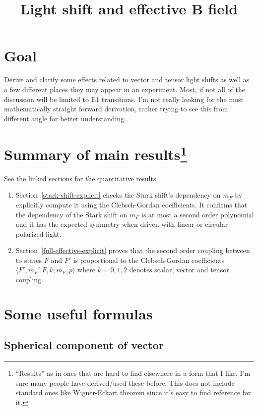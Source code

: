 \documentclass[10pt,fleqn]{article}
\title{Light shift and effective B field}
\begin{document}
\maketitle

\section{Goal}
Derive and clarify some effects related to vector and tensor light shifts
as well as a few different places they may appear in an experiment.
Most, if not all of the discussion will be limited to E1 transitions.
I'm not really looking for the most mathematically straight forward derivation,
rather trying to see this from different angle for better understanding.

\section[Summary of main results]{Summary of main results\protect\footnote{``Results'' as in ones that are hard to find elsewhere in a form that I like. I'm sure many people have derived/used these before. This does not include standard ones like Wigner-Eckart theorem since it's easy to find reference for it.}}

See the linked sections for the quantitative results.
\begin{enumerate}
\item Section~\ref{stark-shift-explicit} checks the Stark shift's dependency
  on $m_F$ by explicitly compute it using the Clebsch-Gordan coefficients.
  It confirms that {\color{blue}the dependency of the Stark shift on $m_F$
    is at most a second order polynomial} and it has the expected symmetry
  when driven with linear or circular polarized light.
\item Section~\ref{full-effective-explicit} proves that the second order coupling
  between to states $F$ and $F'$ is {\color{blue}proportional to
    the Clebsch-Gordan coefficients $\langle F',m_F'|F,k;m_F,p\rangle$}
  where $k=0,1,2$ denotes scalar, vector and tensor coupling.
\end{enumerate}

\section{Some useful formulas}

\subsection{Spherical component of vector}
\end{document}

